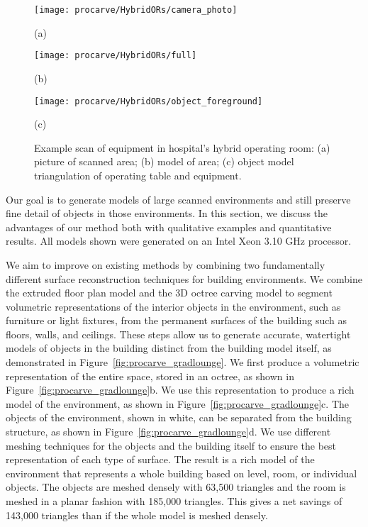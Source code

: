 \documentclass[12pt,onecolumn,oneside]{book}
\begin{document}
\begin{figure}[t]

	\centering
	\begin{minipage}[t]{0.7\linewidth}
		\centerline{\texttt{[image: procarve/HybridORs/camera\_photo]}}
		\centerline{(a)}
	\end{minipage}
	
	\begin{minipage}[t]{0.7\linewidth}%
		\centerline{\texttt{[image: procarve/HybridORs/full]}}
		\centerline{(b)}
	\end{minipage}

	\begin{minipage}[t]{0.7\linewidth}
		\centerline{\texttt{[image: procarve/HybridORs/object\_foreground]}}
		\centerline{(c)}
	\end{minipage}

	\caption[Example scan of equipment in hospital operating room.]{Example scan of equipment in hospital's hybrid operating room: (a) picture of scanned area; (b) model of area; (c) object model triangulation of operating table and equipment.}
	\label{fig:procarve_hybrid}

\end{figure}

Our goal is to generate models of large scanned environments and still preserve fine detail of objects in those environments.  In this section, we discuss the advantages of our method both with qualitative examples and quantitative results.  All models shown were generated on an Intel Xeon 3.10 GHz processor.

We aim to improve on existing methods by combining two fundamentally different surface reconstruction techniques for building environments.  We combine the extruded floor plan model and the 3D octree carving model to segment volumetric representations of the interior objects in the environment, such as furniture or light fixtures, from the permanent surfaces of the building such as floors, walls, and ceilings. These steps allow us to generate accurate, watertight models of objects in the building distinct from the building model itself, as demonstrated in Figure~\ref{fig:procarve_gradlounge}.  We first produce a volumetric representation of the entire space, stored in an octree, as shown in Figure~\ref{fig:procarve_gradlounge}b.  We use this representation to produce a rich model of the environment, as shown in Figure~\ref{fig:procarve_gradlounge}c.  The objects of the environment, shown in white, can be separated from the building structure, as shown in Figure~\ref{fig:procarve_gradlounge}d.  We use different meshing techniques for the objects and the building itself to ensure the best representation of each type of surface.  The result is a rich model of the environment that represents a whole building based on level, room, or individual objects.  The objects are meshed densely with 63,500 triangles and the room is meshed in a planar fashion with 185,000 triangles.  This gives a net savings of 143,000 triangles than if the whole model is meshed densely.
\end{document}
